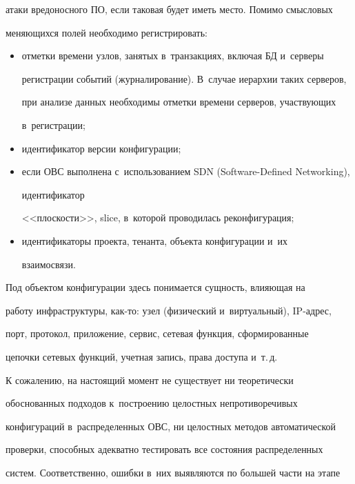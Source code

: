 атаки вредоносного ПО, если таковая будет иметь место. Помимо смысловых 


меняющихся полей необходимо регистрировать: 


   \begin{itemize}


\item отметки времени узлов, занятых в~транзакциях, включая БД и~серверы 


регистрации событий (журналирование). В~случае иерархии таких серверов, 


при анализе данных необходимы отметки времени серверов, участвующих 


в~регистрации; 


\item идентификатор версии конфигурации; 


\item если ОВС выполнена с~использованием SDN (Software-Defined Networking), 


идентификатор 


<<плоскости>>, slice, в~которой проводилась реконфигурация; 


\item идентификаторы проекта, тенанта, объекта конфигурации и~их 


взаимосвязи.


\end{itemize}





Под объектом конфигурации здесь понимается сущность, влияющая на 


работу инфраструктуры, как-то: узел (физический и~виртуальный), IP-ад\-рес, 


порт, протокол, приложение, сервис, сетевая функция, сформированные 


цепочки сетевых функций, учетная запись, права доступа и~т.\,д.


   


   К сожалению, на настоящий момент не существует ни теоретически 


обоснованных подходов к~построению целостных непротиворечивых 


конфигураций в~распределенных ОВС, ни целостных методов автоматической 


проверки, способных адекватно тестировать все состояния распределенных 


систем. Соответственно, ошибки в~них выявляются по большей части на этапе 


